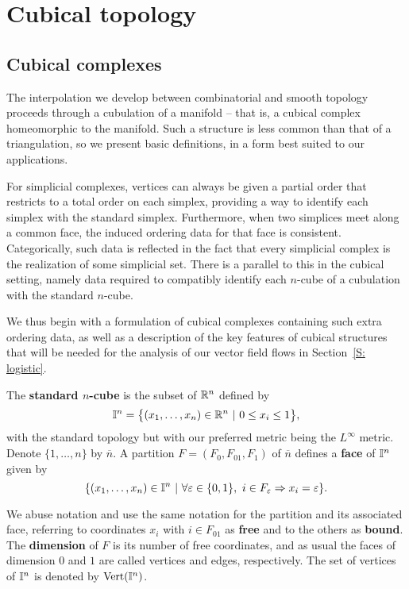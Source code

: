 

\section{Cubical topology} \label{S: cubical topology}

\subsection{Cubical complexes}

The interpolation we develop between combinatorial and smooth topology proceeds through a cubulation of a manifold -- that is, a cubical complex homeomorphic to the manifold.
Such a structure is less common than that of a triangulation, so we present basic definitions,  in a form best suited to our applications.

For simplicial complexes, vertices can always be given a partial order that restricts to a total order on each simplex, providing a way to identify each simplex with the standard simplex.
Furthermore, when two simplices meet along a common face, the induced ordering data for that face is consistent.
Categorically, such data is reflected in the fact that every simplicial complex is the realization of some simplicial set.
There is a parallel to this in the cubical setting, namely data required to compatibly identify each $n$-cube of a cubulation with the standard $n$-cube.

We thus begin with a formulation of cubical complexes containing such extra ordering data, as well as a description of the key features of cubical structures that will be needed for the analysis of our vector field flows in Section~\ref{S: logistic}.

The \textbf{standard $n$-cube} is the subset of $\mathbb{R}^n$ defined by
\begin{equation*}
\mathbb{I}^n = \big\{ (x_1, \dots, x_n) \in \mathbb{R}^n\ |\ 0 \leq x_i \leq 1 \big\},
\end{equation*}
with the standard topology but with our preferred metric being the $L^\infty$ metric.
Denote $\{1, \dots, n\}$ by $\overline{n}$.
A partition $F = (F_0, F_{01}, F_1)$ of $\overline n$ defines a \textbf{face} of $\mathbb{I}^n$ given by
\begin{equation*}
\{(x_1, \dots, x_n) \in \mathbb{I}^n\ |\ \forall \varepsilon \in \{0, 1\},\ i \in F_\varepsilon \Rightarrow x_i = \varepsilon\}.
\end{equation*}

We abuse notation and use the same notation for the partition and its associated face, referring to coordinates $x_i$ with $i \in F_{01}$ as \textbf{free}
and to the others as \textbf{bound}.
The \textbf{dimension} of $F$ is its number of free coordinates, and as usual the faces of dimension $0$ and $1$ are called vertices and edges, respectively.
The set of vertices of $\mathbb{I}^n$ is denoted by ${\rm Vert}(\mathbb{I}^n)$.

